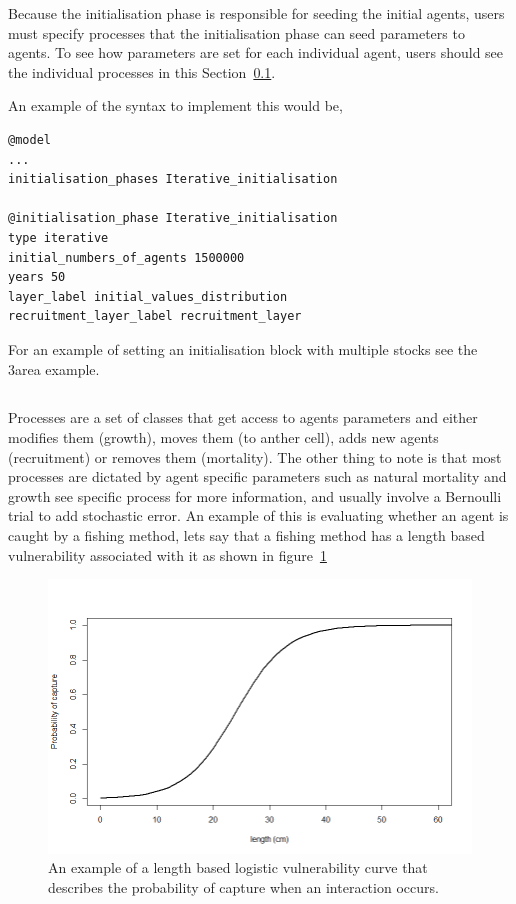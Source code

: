 Because the initialisation phase is responsible for seeding the initial agents, users must specify processes that the initialisation phase can seed parameters to agents. To see how parameters are set for each individual agent, users should see the individual processes in this Section~\ref{sec:process}.

An example of the syntax to implement this would be,
{\small{\begin{verbatim}
@model
...
initialisation_phases Iterative_initialisation

@initialisation_phase Iterative_initialisation
type iterative
initial_numbers_of_agents 1500000
years 50
layer_label initial_values_distribution
recruitment_layer_label recruitment_layer
\end{verbatim}}}

For an example of setting an initialisation block with multiple stocks see the 3area example.


\subsection{}\label{sec:process}
Processes are a set of classes that get access to agents parameters and either modifies them (growth), moves them (to anther cell), adds new agents (recruitment) or removes them (mortality). The other thing to note is that most processes are dictated by agent specific parameters such as natural mortality and growth see specific process for more information, and usually involve a Bernoulli trial to add stochastic error. An example of this is evaluating whether an agent is caught by a fishing method, lets say that a fishing method has a length based vulnerability associated with it as shown in figure~\ref{fig:capture}


\begin{figure}[htp]\label{fig:capture}
	\centering
	\includegraphics[scale=0.6]{Figures/vulnerability.png}%
	\caption{An example of a length based logistic vulnerability curve that describes the probability of capture when an interaction occurs.}
\end{figure}


